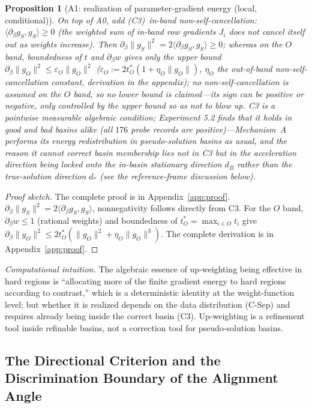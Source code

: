 \documentclass[11pt]{article}
\newtheorem{proposition}{Proposition}[section]
\numberwithin{equation}{section}
\begin{document}
\begin{proposition}[A1: realization of parameter-gradient energy (local, conditional)]\label{prop:mechA1}
On top of A0, add (C3)~\emph{in-band non-self-cancellation}: $\langle\partial_\beta g_S,g_S\rangle\ge0$ (the weighted sum of in-band row gradients $J_i$ does not cancel itself out as weights increase). Then $\partial_\beta\|g_S\|^2=2\langle\partial_\beta g_S,g_S\rangle\ge0$; whereas on the $O$ band, boundedness of $t$ and $\partial_\beta w$ gives only the upper bound $\partial_\beta\|g_O\|^2\le\varepsilon_O\|g_O\|^2$ ($\varepsilon_O:=2t_O^*(1+\eta_O\|g_O\|)$, $\eta_O$ the out-of-band non-self-cancellation constant, derivation in the appendix); no non-self-cancellation is assumed on the $O$ band, so no lower bound is claimed---its sign can be positive or negative, only controlled by the upper bound so as not to blow up. C3 is a pointwise measurable algebraic condition; Experiment 5.2 finds that it holds in good and bad basins alike (all $176$ probe records are positive)---Mechanism~A performs its energy redistribution in pseudo-solution basins as usual, and the reason it cannot correct basin membership lies not in C3 but in the acceleration direction being locked onto the in-basin stationary direction $d_B$ rather than the true-solution direction $d_*$ (see the reference-frame discussion below).
\end{proposition}
\begin{proof}[Proof sketch] The complete proof is in Appendix~\ref{app:proof}.
$\partial_\beta\|g_S\|^2=2\langle\partial_\beta g_S,g_S\rangle$, nonnegativity follows directly from C3. For the $O$ band, $\partial_\beta w\le1$ (rational weights) and boundedness of $t_O^*=\max_{i\in O}t_i$ give $\partial_\beta\|g_O\|^2\le2t_O^*(\|g_O\|^2+\eta_O\|g_O\|^3)$. The complete derivation is in Appendix~\ref{app:proof}.
\end{proof}

\noindent\emph{Computational intuition.} The algebraic essence of up-weighting being effective in hard regions is ``allocating more of the finite gradient energy to hard regions according to contrast,'' which is a deterministic identity at the weight-function level; but whether it is realized depends on the data distribution (C-Sep) and requires already being inside the correct basin (C3). Up-weighting is a refinement tool inside refinable basins, not a correction tool for pseudo-solution basins.

\subsection{The Directional Criterion and the Discrimination Boundary of the Alignment Angle}\label{sec:theta-align}
\end{document}
